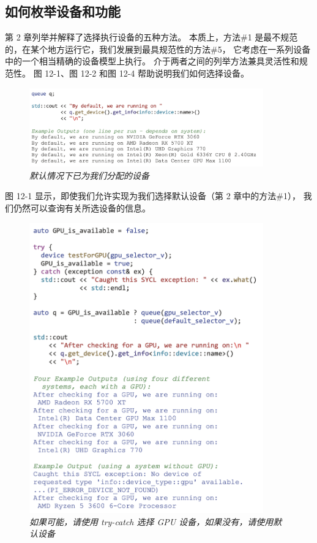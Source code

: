 \subsection{如何枚举设备和功能}
第 2 章列举并解释了选择执行设备的五种方法。 
本质上，方法\#1 是最不规范的，在某个地方运行它，我们发展到最具规范性的方法\#5，
它考虑在一系列设备中的一个相当精确的设备模型上执行。 介于两者之间的列举方法兼具灵活性和规范性。 
图 12-1、图 12-2 和图 12-4 帮助说明我们如何选择设备。

\begin{figure}[H]
	\centering
	\includegraphics[width=0.9\textwidth]{figs/F12.1.png}
	\caption{\textit{默认情况下已为我们分配的设备 }}
\end{figure}

图 12-1 显示，即使我们允许实现为我们选择默认设备（第 2 章中的方法\#1），
我们仍然可以查询有关所选设备的信息。

\begin{figure}[H]
	\centering
	\includegraphics[width=0.9\textwidth]{figs/F12.2.png}
	\caption{\textit{如果可能，请使用 try-catch 选择 GPU 设备，如果没有，请使用默认设备 }}
\end{figure}

